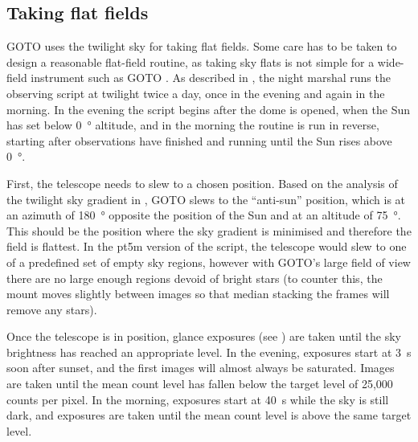 
\subsection{Taking flat fields}
\label{sec:flats}
\begin{colsection}

GOTO uses the twilight sky for taking flat fields. Some care has to be taken to design a reasonable flat-field routine, as taking sky flats is not simple for a wide-field instrument such as GOTO \citep{flats3, flats2}. As described in , the night marshal runs the  observing script at twilight twice a day, once in the evening and again in the morning. In the evening the script begins after the dome is opened, when the Sun has set below \SI{0}{\degree} altitude, and in the morning the routine is run in reverse, starting after observations have finished and running until the Sun rises above \SI{0}{\degree}.

First, the telescope needs to slew to a chosen position. Based on the analysis of the twilight sky gradient in \citet{flats}, GOTO slews to the ``anti-sun'' position, which is at an azimuth of \SI{180}{\degree} opposite the position of the Sun and at an altitude of \SI{75}{\degree}. This should be the position where the sky gradient is minimised and therefore the field is flattest. In the pt5m version of the script, the telescope would slew to one of a predefined set of empty sky regions, however with GOTO's large field of view there are no large enough regions devoid of bright stars (to counter this, the mount moves slightly between images so that median stacking the frames will remove any stars).

Once the telescope is in position, glance exposures (see ) are taken until the sky brightness has reached an appropriate level. In the evening, exposures start at \SI{3}{\second} soon after sunset, and the first images will almost always be saturated. Images are taken until the mean count level has fallen below the target level of 25,000 counts per pixel. In the morning, exposures start at \SI{40}{\second} while the sky is still dark, and exposures are taken until the mean count level is above the same target level.


\end{colsection}
